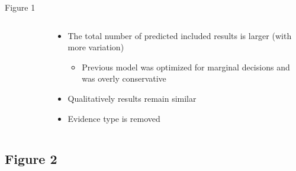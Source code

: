\documentclass[9pt,aspectratio=169]{beamer}
\begin{document}
\begin{frame}{Figure 1}
\begin{columns}
	\begin{column}{0.682\linewidth}
		\begin{figure}
		\end{figure}
		
	\end{column}
	\begin{column}{0.318\linewidth}
		\begin{itemize}
			\item The total number of predicted included results is larger (with more variation)
			\begin{itemize}
				\item Previous model was optimized for marginal decisions and was overly conservative
			\end{itemize}
		 	\item Qualitatively results remain similar
			\item Evidence type is removed
		\end{itemize}
	\end{column}
\end{columns}
\end{frame}

\subsection{Figure 2}
\end{document}
